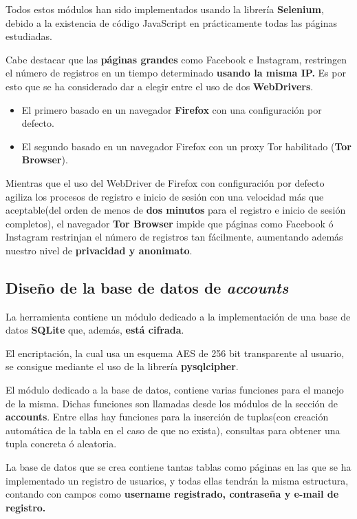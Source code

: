 Todos estos módulos han sido implementados usando la librería \textbf{Selenium}, debido a la existencia de código JavaScript en prácticamente todas las páginas estudiadas. 

Cabe destacar que las \textbf{páginas grandes} como Facebook e Instagram, restringen el número de registros en un tiempo determinado \textbf{usando la misma IP.} Es por esto que se ha considerado dar a elegir entre el uso de dos \textbf{WebDrivers}. 

\begin{itemize}
	\item El primero basado en un navegador \textbf{Firefox} con una configuración por defecto.
	\item El segundo basado en un navegador Firefox con un proxy Tor habilitado (\textbf{Tor Browser}).
\end{itemize} 

Mientras que el uso del WebDriver de Firefox con configuración por defecto agiliza los procesos de registro e inicio de sesión con una velocidad más que aceptable(del orden de menos de\textbf{ dos minutos} para el registro e inicio de sesión completos), el navegador \textbf{Tor Browser} impide que páginas como Facebook ó Instagram restrinjan el número de registros tan fácilmente, aumentando además nuestro nivel de \textbf{privacidad y anonimato}.

\subsection{Diseño de la base de datos de \textit{accounts}}

La herramienta contiene un módulo dedicado a la implementación de una base de datos \textbf{SQLite }que, además, \textbf{está cifrada}.

El encriptación, la cual usa un esquema AES de 256 bit transparente al usuario, se consigue mediante el uso de la librería \textbf{pysqlcipher}.

El módulo dedicado a la base de datos, contiene varias funciones para el manejo de la misma. Dichas funciones son llamadas desde los módulos de la sección de \textbf{accounts}. Entre ellas hay funciones para la inserción de tuplas(con creación automática de la tabla en el caso de que no exista), consultas para obtener una tupla concreta ó aleatoria.

La base de datos que se crea contiene tantas tablas como páginas en las que se ha implementado un registro de usuarios, y todas ellas tendrán la misma estructura, contando con campos como \textbf{username registrado, contraseña y e-mail de registro.}

